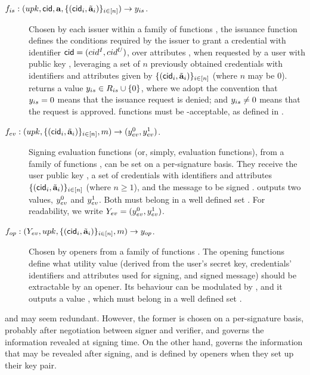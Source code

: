 \begin{description}
\item[$f_{is}: (upk,\mathsf{cid},\mathbf{a},\lbrace (\mathsf{cid}_i,\tilde{\mathbf{a}}_i)\rbrace_{i \in [n]})
  \rightarrow y_{is}$.] Chosen
  by each issuer within a family of functions \famfissue, the issuance function
  defines the conditions required by the issuer to grant a credential
  with identifier $\mathsf{cid} = (cid^I,cid^U)$, over attributes \attrs, when requested
  by a user with public key \upk, leveraging a set of $n$ previously obtained
  credentials with identifiers and attributes given by $\lbrace (\mathsf{cid}_i,
  \tilde{\mathbf{a}}_i) \rbrace_{i \in [n]}$ (where $n$ may be $0$). \fissue returns
  a value $y_{is} \in R_{is} \cup \lbrace 0 \rbrace$, where we adopt the
  convention that $y_{is} = 0$ means that the issuance request is denied; and
  $y_{is} \neq 0$ means that the request is approved. \fissue functions must be
  \UAS-acceptable, as defined in .
\item[$f_{ev}: (upk,\lbrace(\mathsf{cid}_i,\tilde{\mathbf{a}}_i)\rbrace_{i \in [n]},m)
  \rightarrow (y_{ev}^0,y_{ev}^1)$.] Signing evaluation functions (or, simply,
  evaluation functions), from a
  family of functions \famfeval, can be set on a per-signature basis. They
  receive the user public key \upk, a set of credentials with identifiers
  and attributes $\lbrace (\mathsf{cid}_i,\tilde{\mathbf{a}}_i) \rbrace_{i \in [n]}$
  (where $n \ge 1$), and the message to be signed \msg. \feval outputs two
  values, $y_{ev}^0$ and $y_{ev}^1$. Both must belong in a well defined set
  \rngfeval. For readability, we write $Y_{ev} = (y_{ev}^0,y_{ev}^1)$.
\item[$f_{op}: (Y_{ev},upk,\lbrace (\mathsf{cid}_i,\tilde{\mathbf{a}}_i) \rbrace_{i \in [n]},
  m) \rightarrow y_{op}$.]
  Chosen by openers from a family of functions \famfinsp. The opening
  functions define what utility value (derived from the user's secret key,
  credentials' identifiers and attributes used for signing, and signed message)
  should be extractable by an opener. Its behaviour can be modulated by \Yeval,
  and it outputs a value \yinsp, which must belong in a well defined set
  \rngfinsp.
\end{description}

\feval and \finsp may seem redundant. However, the former is chosen on a
per-signature basis, probably after negotiation between signer and verifier, and
governs the information revealed at signing time. On the other hand, \finsp
governs the information that may be revealed after signing, and is defined by
openers when they set up their key pair.

